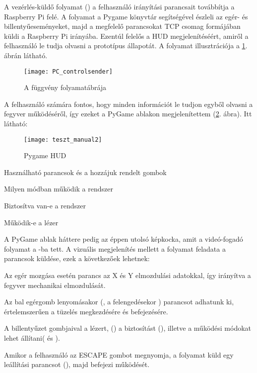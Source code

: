 A vezérlés-küldő folyamat () a felhasználó irányítási parancsait továbbítja a Raspberry Pi felé. A folyamat a Pygame könyvtár segítségével észleli az egér- és billentyűeseményeket, majd a megfelelő parancsokat TCP csomag formájában küldi a Raspberry Pi irányába. Ezentúl felelős a HUD megjelenítéséért, amiről a felhasználó le tudja olvasni a prototípus állapotát. A folyamat illusztrációja a \ref{fig:PC_controlsender}. ábrán látható.\\


\begin{figure}[h!]
	\centering
	\texttt{[image: PC\_controlsender]}
	\caption{A  függvény folyamatábrája}
	\label{fig:PC_controlsender}
\end{figure}

A felhasználó számára fontos, hogy minden információt le tudjon egyből olvasni a fegyver működéséről, így ezeket a PyGame ablakon megjelenítettem (\ref{fig:teszt_manual1}. ábra). Itt látható:

\begin{figure}[h!]
	\centering
	\texttt{[image: teszt\_manual2]}
	\caption{Pygame HUD}
	\label{fig:teszt_manual1}
\end{figure}


\begin{list}{-}{}
	\item Használható parancsok és a hozzájuk rendelt gombok
	\item Milyen módban működik a rendszer
	\item Biztosítva van-e a rendszer
	\item Működik-e a lézer
\end{list}

A PyGame ablak háttere pedig az éppen utolsó képkocka, amit a videó-fogadó folyamat a -ba tett. A vizuális megjelenítés mellett a folyamat feladata a parancsok küldése, ezek a következőek lehetnek:

\begin{list}{-}{}
	\item Az egér mozgása esetén  parancs az X és Y elmozdulási adatokkal, így irányítva a fegyver mechanikai elmozdulását.
	\item Az bal egérgomb lenyomásakor (, a felengedésekor ) parancsot adhatunk ki, értelemszerűen a tüzelés megkezdésére és befejezésére.
	\item A billentyűzet gombjaival a lézert, () a biztosítást (), illetve a működési módokat lehet állítani( és ).
	\item Amikor a felhasználó az ESCAPE gombot megnyomja, a folyamat küld egy leállítási parancsot (), majd befejezi működését.
\end{list}

